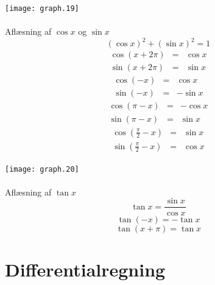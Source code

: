 \documentclass[11pt,a5paper,fleqn,leqno]{book}
\begin{document}
\texttt{[image: graph.19]}
\\
\\
Aflæsning af $\cos x$ og $\sin x$
\begin{equation}
(\cos x)^2 + (\sin x)^2 = 1
\end{equation}
\begin{eqnarray}
\cos(x + 2\pi) & = & \cos x \\
\sin(x + 2\pi) & = & \sin x \nonumber
\end{eqnarray}
\begin{eqnarray}
\cos(-x) & = & \cos x \\
\sin(-x) & = & - \sin x \nonumber
\end{eqnarray}
\begin{eqnarray}
\cos(\pi - x) & = & - \cos x \\
\sin(\pi - x) & = & \sin x \nonumber
\end{eqnarray}
\begin{eqnarray}
\cos\left(\frac{\pi}{2}-x\right) & = & \sin x \\
\sin\left(\frac{\pi}{2}-x\right) & = & \cos x \nonumber
\end{eqnarray}

\texttt{[image: graph.20]}
\\
\\
Aflæsning af $\tan x$
\begin{equation}
\tan x = \frac{\sin x}{\cos x}
\end{equation}
\begin{equation}
\tan(-x) = -\tan x
\end{equation}
\begin{equation}
\tan(x+\pi) = \tan x
\end{equation}

\newpage

\section{Differentialregning}
\end{document}
